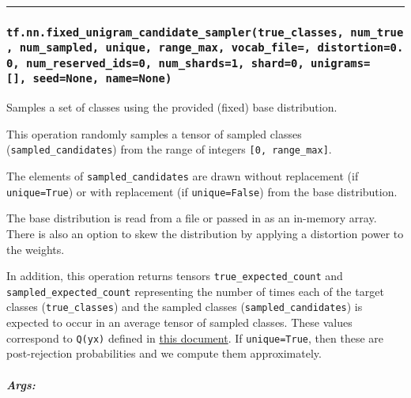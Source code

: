 \begin{center}\rule{0.5\linewidth}{\linethickness}\end{center}

\subsubsection{\texorpdfstring{\texttt{tf.nn.fixed\_unigram\_candidate\_sampler(true\_classes,\ num\_true,\ num\_sampled,\ unique,\ range\_max,\ vocab\_file=\textquotesingle{}\textquotesingle{},\ distortion=0.0,\ num\_reserved\_ids=0,\ num\_shards=1,\ shard=0,\ unigrams={[}{]},\ seed=None,\ name=None)}
}{tf.nn.fixed\_unigram\_candidate\_sampler(true\_classes, num\_true, num\_sampled, unique, range\_max, vocab\_file='', distortion=0.0, num\_reserved\_ids=0, num\_shards=1, shard=0, unigrams={[}{]}, seed=None, name=None) }}\label{tf.nn.fixedux5funigramux5fcandidateux5fsamplertrueux5fclasses-numux5ftrue-numux5fsampled-unique-rangeux5fmax-vocabux5ffile-distortion0.0-numux5freservedux5fids0-numux5fshards1-shard0-unigrams-seednone-namenone}

Samples a set of classes using the provided (fixed) base distribution.

This operation randomly samples a tensor of sampled classes
(\texttt{sampled\_candidates}) from the range of integers
\texttt{{[}0,\ range\_max{]}}.

The elements of \texttt{sampled\_candidates} are drawn without
replacement (if \texttt{unique=True}) or with replacement (if
\texttt{unique=False}) from the base distribution.

The base distribution is read from a file or passed in as an in-memory
array. There is also an option to skew the distribution by applying a
distortion power to the weights.

In addition, this operation returns tensors
\texttt{true\_expected\_count} and \texttt{sampled\_expected\_count}
representing the number of times each of the target classes
(\texttt{true\_classes}) and the sampled classes
(\texttt{sampled\_candidates}) is expected to occur in an average tensor
of sampled classes. These values correspond to \texttt{Q(y\textbar{}x)}
defined in
\href{http://www.tensorflow.org/extras/candidate_sampling.pdf}{this
document}. If \texttt{unique=True}, then these are post-rejection
probabilities and we compute them approximately.

\subparagraph{Args: }\label{args-28}

